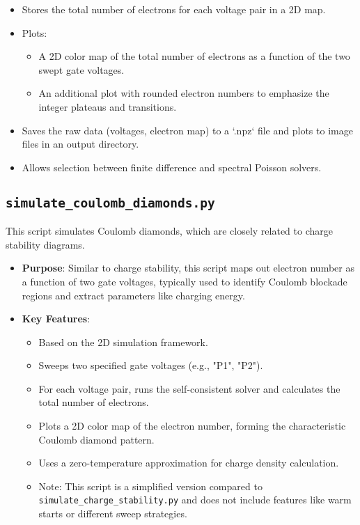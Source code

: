 \documentclass{article}
\begin{document}
\begin{itemize}
\begin{itemize}
            \item Stores the total number of electrons for each voltage pair in a 2D map.
            \item Plots:
                \begin{itemize}
                    \item A 2D color map of the total number of electrons as a function of the two swept gate voltages.
                    \item An additional plot with rounded electron numbers to emphasize the integer plateaus and transitions.
                \end{itemize}
            \item Saves the raw data (voltages, electron map) to a `.npz` file and plots to image files in an output directory.
            \item Allows selection between finite difference and spectral Poisson solvers.
        \end{itemize}
\end{itemize}

\subsection{\texttt{simulate\_coulomb\_diamonds.py}}
This script simulates Coulomb diamonds, which are closely related to charge stability diagrams.
\begin{itemize}
    \item \textbf{Purpose}: Similar to charge stability, this script maps out electron number as a function of two gate voltages, typically used to identify Coulomb blockade regions and extract parameters like charging energy.
    \item \textbf{Key Features}:
        \begin{itemize}
            \item Based on the 2D simulation framework.
            \item Sweeps two specified gate voltages (e.g., "P1", "P2").
            \item For each voltage pair, runs the self-consistent solver and calculates the total number of electrons.
            \item Plots a 2D color map of the electron number, forming the characteristic Coulomb diamond pattern.
            \item Uses a zero-temperature approximation for charge density calculation.
            \item Note: This script is a simplified version compared to \texttt{simulate\_charge\_stability.py} and does not include features like warm starts or different sweep strategies.
        \end{itemize}
\end{itemize}
\end{document}
